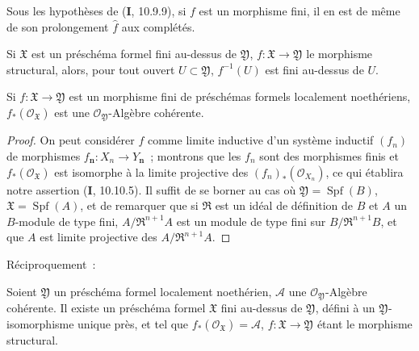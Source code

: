 \begin{corollary}[4.8.4]
\label{III.4.8.4-fr}
Sous les hypothèses de \textup{(\textbf{I}, 10.9.9)}, si $f$ est un morphisme fini, il en est de
même de son prolongement $\widehat f$ aux complétés.
\end{corollary}

\begin{corollary}[4.8.5]
\label{III.4.8.5-fr}
Si $\mathfrak X$ est un préschéma formel fini au-dessus de $\mathfrak Y$,
$f:\mathfrak X\to\mathfrak Y$ le morphisme structural, alors, pour tout ouvert
$U\subset\mathfrak Y$, $f^{-1}(U)$ est fini au-dessus de $U$.
\end{corollary}

\begin{proposition}[4.8.6]
\label{III.4.8.6-fr}
Si $f:\mathfrak X\to\mathfrak Y$ est un morphisme fini de préschémas formels
localement noethériens, $f_*(\mathcal O_{\mathfrak X})$ est une
$\mathcal O_{\mathfrak Y}$-Algèbre cohérente.
\end{proposition}

\begin{proof}
On peut considérer $f$ comme limite inductive d'un système inductif $(f_n)$ de
morphismes $f_{\boldsymbol{n}}:X_n\to Y_{\boldsymbol{n}}$~; montrons que les $f_n$ sont des morphismes finis
et $f_*(\mathcal O_{\mathfrak X})$ est isomorphe à la limite projective des
$(f_n)_*(\mathcal O_{X_n})$, ce qui établira notre assertion (\textbf{I}, 10.10.5). Il
suffit de se borner au cas où $\mathfrak Y=\operatorname{Spf}(B)$,
$\mathfrak X=\operatorname{Spf}(A)$, et de remarquer que si $\mathfrak R$ est
un idéal de définition de $B$ et $A$ un $B$-module de type fini,
$A/\mathfrak R^{n+1}A$ est un module de type fini sur
$B/\mathfrak R^{n+1}B$, et que $A$ est limite projective des
$A/\mathfrak R^{n+1}A$.
\end{proof}

Réciproquement~:

\begin{proposition}[4.8.7]
\label{III.4.8.7-fr}
Soient $\mathfrak Y$ un préschéma formel localement noethérien, $\mathcal A$
une $\mathcal O_{\mathfrak Y}$-Algèbre cohérente. Il existe un préschéma
formel $\mathfrak X$ fini au-dessus de $\mathfrak Y$, défini à un
$\mathfrak Y$-isomorphisme unique près, et tel que
$f_*(\mathcal O_{\mathfrak X})=\mathcal A$, $f:\mathfrak X\to\mathfrak Y$
étant le morphisme structural.
\end{proposition}

